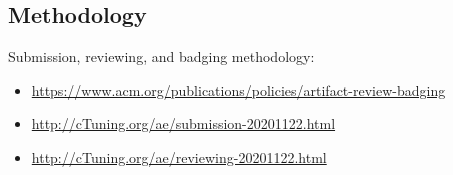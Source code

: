 \documentclass[10pt]{article}
\begin{document}
\subsection{Methodology}
Submission, reviewing, and badging methodology:
\begin{itemize}
  \item \url{https://www.acm.org/publications/policies/artifact-review-badging}
  \item \url{http://cTuning.org/ae/submission-20201122.html}
  \item \url{http://cTuning.org/ae/reviewing-20201122.html}
\end{itemize}

\end{document}

